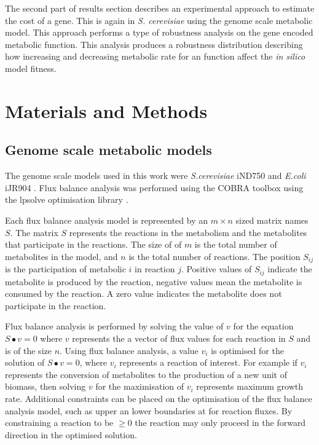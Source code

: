 The second part of results section describes an experimental approach to estimate the cost of a gene. This is again in \emph{S. cerevisiae} using the genome scale metabolic model. This approach performs a type of robustness analysis on the gene encoded metabolic function. This analysis produces a robustness distribution describing how increasing and decreasing metabolic rate for an function affect the \emph{in silico} model fitness.

\clearpage

\section{Materials and Methods}

\subsection{Genome scale metabolic models}

The genome scale models used in this work were \emph{S.cerevisiae} iND750 \cite{duarte2004a} and \emph{E.coli} iJR904 \cite{reed2003}. Flux balance analysis was performed using the COBRA toolbox \cite{becker2007} using the lpsolve optimisation library \cite{lpsolve}.

Each flux balance analysis model is represented by an $m \times n$ sized matrix names $S$. The matrix $S$ represents the reactions in the metabolism and the metabolites that participate in the reactions. The size of of $m$ is the total number of metabolites in the model, and $n$ is the total number of reactions. The position $S_{ij}$ is the participation of metabolic $i$ in reaction $j$. Positive values of $S_{ij}$ indicate the metabolite is produced by the reaction, negative values mean the metabolite is consumed by the reaction. A zero value indicates the metabolite does not participate in the reaction.

Flux balance analysis is performed by solving the value of $v$ for the equation $S \bullet v = 0$ where $v$ represents the a vector of flux values for each reaction in $S$ and is of the size $n$. Using flux balance analysis, a value $v_{i}$ is optimised for the solution of $S \bullet v = 0$, where $v_{i}$ represents a reaction of interest. For example if $v_{i}$ represents the conversion of metabolites to the production of a new unit of biomass, then solving $v$ for the maximisation of $v_{i}$ represents maximum growth rate. Additional constraints can be placed on the optimisation of the flux balance analysis model, such as upper an lower boundaries at for reaction fluxes. By constraining a reaction to be $\geq 0$ the reaction may only proceed in the forward direction in the optimised solution.

